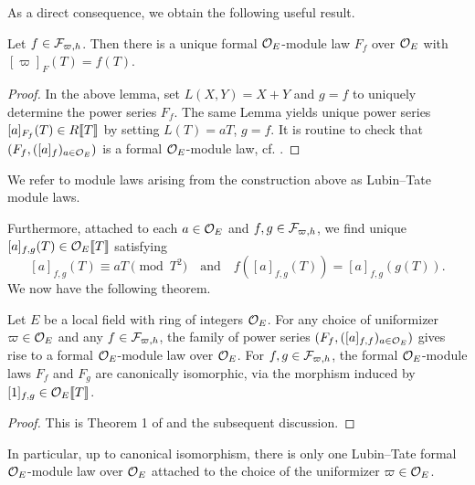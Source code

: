 \documentclass[../main.tex]{subfiles}
\begin{document}
As a direct consequence, we obtain the following useful result.
\begin{lem}
  Let $f \in \mathcal{F}_{\varpi, h}$. Then there is a unique formal ${\mathcal{O}_E}$-module law $F_f$ over ${\mathcal{O}_E}$
  with $[\varpi]_F(T) = f(T)$.
\begin{proof}
  In the above lemma, set $L(X,Y) = X+Y$ and $g=f$ to uniquely determine 
  the power series $F_f$. The same Lemma yields unique power series
  $[a]_{F_f}(T) \in R\llbracket T \rrbracket$ by setting $L(T) = a T$, $g=f$. It is
  routine to check that $(F_f, ([a]_f)_{a \in {\mathcal{O}_E}})$ is a formal ${\mathcal{O}_E}$-module law, 
  cf. \cite{LubinTateFormalMult}.
\end{proof}
\end{lem}

\begin{defi}
  We refer to module laws arising from the construction above as Lubin--Tate module laws.
\end{defi}

Furthermore, attached to each $a \in \mathcal{O}_E$ and $f,g \in \mathcal{F}_{\varpi,h}$, we find
unique $[a]_{f,g}(T) \in \mathcal{O}_E\llbracket T \rrbracket$ satisfying
\begin{equation}\label{eq:LTMoLaScaCond}
  [a]_{f,g}(T) \equiv aT \pmod {T^2} \quad \text{and} \quad
  f([a]_{f,g}(T)) = [a]_{f,g}(g(T)).
\end{equation}
We now have the following theorem.
\begin{thm}\label{thm:LTModLaw}
  Let $E$ be a local field with ring of integers $\mathcal{O}_E$. For any choice of 
  uniformizer $\varpi \in \mathcal{O}_E$ and any $f \in \mathcal{F}_{\varpi,h}$, the family of power
  series $(F_f, ([a]_{f,f})_{a \in \mathcal{O}_E})$
  gives rise to a formal $\mathcal{O}_E$-module law over $\mathcal{O}_E$. For 
  $f,g \in \mathcal{F}_{\varpi,h}$, the formal $\mathcal{O}_E$-module laws $F_f$ and $F_g$ are
  canonically isomorphic, via the morphism induced by $[1]_{f,g} \in \mathcal{O}_E\llbracket
  T \rrbracket$. 
\begin{proof}
  This is Theorem 1 of \cite{LubinTateFormalMult} and the subsequent discussion.
\end{proof}
\end{thm}
In particular, up to canonical isomorphism, there is only one Lubin--Tate formal
$\mathcal{O}_E$-module law over $\mathcal{O}_E$ attached to the choice of the uniformizer $\varpi \in
\mathcal{O}_E$. 
\end{document}
